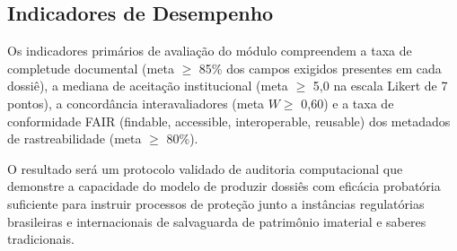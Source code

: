 \subsection{Indicadores de Desempenho}

Os indicadores primários de avaliação do módulo compreendem a taxa de completude documental (meta $\geq$ 85\% dos campos exigidos presentes em cada dossiê), a mediana de aceitação institucional (meta $\geq$ 5,0 na escala Likert de 7 pontos), a concordância interavaliadores (meta $W \geq$ 0,60) e a taxa de conformidade FAIR (findable, accessible, interoperable, reusable) dos metadados de rastreabilidade (meta $\geq$ 80\%).

O resultado será um protocolo validado de auditoria computacional que demonstre a capacidade do modelo de produzir dossiês com eficácia probatória suficiente para instruir processos de proteção junto a instâncias regulatórias brasileiras e internacionais de salvaguarda de patrimônio imaterial e saberes tradicionais.
